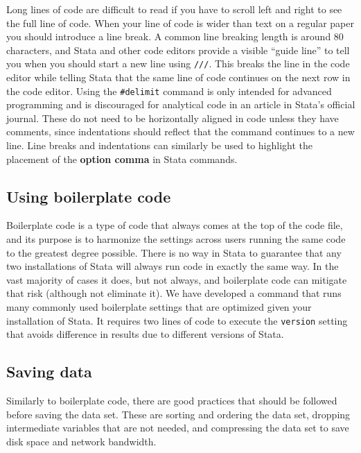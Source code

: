 Long lines of code are difficult to read if you have to scroll left and right to see the full line of code.
When your line of code is wider than text on a regular paper you should introduce a line break.
A common line breaking length is around 80 characters, and Stata and other code editors
provide a visible ``guide line'' to tell you when you should start a new line using \texttt{///}.
This breaks the line in the code editor while telling Stata that the same line of code continues on the next row in the
code editor. Using the \texttt{\#delimit} command is only intended for advanced programming
and is discouraged for analytical code in an article in Stata's official journal.\cite{cox2005styleguide}
These do not need to be horizontally aligned in code unless they have comments,
since indentations should reflect that the command continues to a new line.
Line breaks and indentations can similarly be used to highlight the placement
of the \textbf{option comma} in Stata commands.


\subsection{Using boilerplate code}

Boilerplate code is a type of code that always comes at the top of the code file, and its purpose is to harmonize
the settings across users running the same code to the greatest degree possible. There is no way in Stata to
guarantee that any two installations of Stata will always run code in exactly the same way. In the vast
majority of cases it does, but not always, and boilerplate code can mitigate that risk (although not eliminate
it). We have developed a command that runs many commonly used boilerplate settings that are optimized given
your installation of Stata. It requires two lines of code to execute the \texttt{version}
setting that avoids difference in results due to different versions of Stata.


\subsection{Saving data}

Similarly to boilerplate code, there are good practices that should be followed before saving the data set.
These are sorting and ordering the data set, dropping intermediate variables that are not needed, and
compressing the data set to save disk space and network bandwidth.

